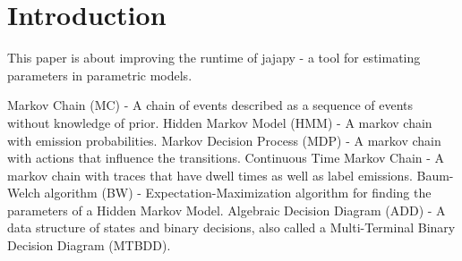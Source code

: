 \section{Introduction}\label{sec:introduction}
This paper is about improving the runtime of jajapy - a tool for estimating parameters in parametric models.




Markov Chain (MC) - A chain of events described as a sequence of events without knowledge of prior.
Hidden Markov Model (HMM) - A markov chain with emission probabilities.
Markov Decision Process (MDP) - A markov chain with actions that influence the transitions.
Continuous Time Markov Chain - A markov chain with traces that have dwell times as well as label emissions.
Baum-Welch algorithm (BW) - Expectation-Maximization algorithm for finding the parameters of a Hidden Markov Model.
Algebraic Decision Diagram (ADD) - A data structure of states and binary decisions, also called a Multi-Terminal Binary Decision Diagram (MTBDD).

